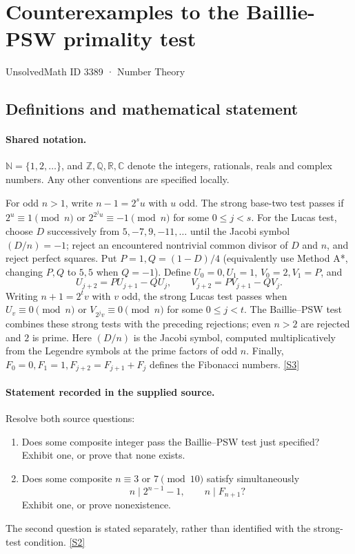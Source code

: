\documentclass[11pt]{article}
\newcommand{\sref}[2]{\hyperlink{source:#1:#2}{[S#2]}}
\begin{document}
\setcounter{section}{3388}
\section{Counterexamples to the Baillie-PSW primality test}\label{3389}
{\small\sffamily UnsolvedMath ID 3389 · Number Theory}
\subsection{Definitions and mathematical statement}

\paragraph{Shared notation.}$\mathbb N=\{1,2,\ldots\}$, and $\mathbb Z,\mathbb Q,\mathbb R,\mathbb C$ denote the integers, rationals, reals and complex numbers. Any other conventions are specified locally.


For odd $n>1$, write $n-1=2^su$ with $u$ odd. The strong base-two test passes if $2^u\equiv1\pmod n$ or $2^{2^ju}\equiv-1\pmod n$ for some $0\le j<s$. For the Lucas test, choose $D$ successively from $5,-7,9,-11,\ldots$ until the Jacobi symbol $(D/n)=-1$; reject an encountered nontrivial common divisor of $D$ and $n$, and reject perfect squares. Put $P=1,Q=(1-D)/4$ (equivalently use Method A*, changing $P,Q$ to $5,5$ when $Q=-1$). Define $U_0=0,U_1=1$, $V_0=2,V_1=P$, and
\[
 U_{j+2}=PU_{j+1}-QU_j,\qquad V_{j+2}=PV_{j+1}-QV_j.
\]
Writing $n+1=2^tv$ with $v$ odd, the strong Lucas test passes when $U_v\equiv0\pmod n$ or $V_{2^jv}\equiv0\pmod n$ for some $0\le j<t$. The Baillie--PSW test combines these strong tests with the preceding rejections; even $n>2$ are rejected and $2$ is prime. Here $(D/n)$ is the Jacobi symbol, computed multiplicatively from the Legendre symbols at the prime factors of odd $n$. Finally, $F_0=0,F_1=1,F_{j+2}=F_{j+1}+F_j$ defines the Fibonacci numbers. \sref{3389}{3}
\paragraph{Statement recorded in the supplied source.}
Resolve both source questions:
\begin{enumerate}
\item Does some composite integer pass the Baillie--PSW test just specified? Exhibit one, or prove that none exists.
\item Does some composite $n\equiv3$ or $7\pmod{10}$ satisfy simultaneously
\[
 n\mid 2^{n-1}-1,\qquad n\mid F_{n+1}?
\]
Exhibit one, or prove nonexistence.
\end{enumerate}
The second question is stated separately, rather than identified with the strong-test condition. \sref{3389}{2}
\end{document}

